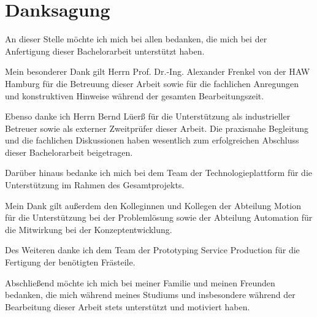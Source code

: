 \clearpage
\thispagestyle{empty}

\section*{Danksagung}
An dieser Stelle möchte ich mich bei allen bedanken, die mich bei der Anfertigung dieser Bachelorarbeit unterstützt haben.

Mein besonderer Dank gilt Herrn Prof. Dr.-Ing. Alexander Frenkel von der HAW Hamburg für die Betreuung dieser Arbeit sowie für die fachlichen Anregungen und konstruktiven Hinweise während der gesamten Bearbeitungszeit.

Ebenso danke ich Herrn Bernd Lüerß für die Unterstützung als industrieller Betreuer sowie als externer Zweitprüfer dieser Arbeit. Die praxisnahe Begleitung und die fachlichen Diskussionen haben wesentlich zum erfolgreichen Abschluss dieser Bachelorarbeit beigetragen.

Darüber hinaus bedanke ich mich bei dem Team der Technologieplattform für die Unterstützung im Rahmen des Gesamtprojekts.

Mein Dank gilt außerdem den Kolleginnen und Kollegen der Abteilung Motion für die Unterstützung bei der Problemlösung sowie der Abteilung Automation für die Mitwirkung bei der Konzeptentwicklung.

Des Weiteren danke ich dem Team der Prototyping Service Production für die Fertigung der benötigten Frästeile.

Abschließend möchte ich mich bei meiner Familie und meinen Freunden bedanken, die mich während meines Studiums und insbesondere während der Bearbeitung dieser Arbeit stets unterstützt und motiviert haben.